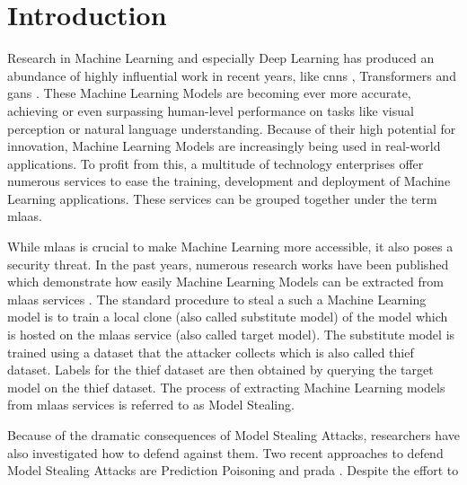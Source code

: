 
\chapter{Introduction}
\label{ch:Introduction}

Research in Machine Learning and especially Deep Learning has produced an abundance of highly influential work in recent years, like
\glspl{cnn} \cite{lecun1998gradient}, Transformers \cite{vaswani2017attention} and \glspl{gan} \cite{goodfellow2020generative}. These
Machine Learning Models are becoming ever more accurate, achieving or even surpassing human-level performance on tasks like visual
perception or natural language understanding. Because of their high potential for
innovation, Machine Learning Models are increasingly being used in real-world applications. To profit from this, a multitude of technology
enterprises offer numerous services to ease the training, development and deployment of Machine Learning applications. These services can
be grouped together under the term \gls{mlaas}. \par
While \gls{mlaas} is crucial to make Machine Learning more accessible, it also poses a security threat. In the past years, numerous research works
have been published which demonstrate how easily Machine Learning Models can be extracted from \gls{mlaas} services \cite{tramer2016stealing}
\cite{reith2019efficiently} \cite{papernot2017practical}. The standard procedure to steal a such a Machine Learning model is to train a local
clone (also called substitute model) of the model which is hosted on the \gls{mlaas} service (also called target model). The substitute model is trained
using a dataset that the attacker collects which is also called thief dataset. Labels for the thief dataset are then obtained by querying the target
model on the thief dataset. The process of extracting Machine Learning models from \gls{mlaas} services is referred to as Model Stealing. \par
Because of the dramatic consequences of Model Stealing Attacks, researchers have also investigated how to defend against them. Two recent approaches
to defend Model Stealing Attacks are Prediction Poisoning \cite{orekondy2019prediction} and \gls{prada} \cite{juuti2019prada}. Despite the effort to

